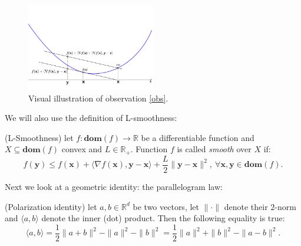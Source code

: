 \begin{figure}[h!]
    \centering
    \includegraphics[width=0.5\textwidth]{figures/observation.pdf}
    \caption{Visual illustration of observation \ref{obs}.}
\end{figure}


\noindent
We will also use the definition of L-smoothness:
\begin{property}
    (L-Smoothness) let $f:\bm{dom}(f) \rightarrow \mathbb{R}$ be a differentiable function and $X \subseteq \bm{dom}(f)$ convex and $L\in\mathbb{R}_+$. Function $f$ is called \textit{smooth} over $X$ if:
    \[  f(\bm{y}) \leq f(\bm{x}) +  \langle \nabla f(\bm{x}) , \bm{y}-\bm{x} \rangle +  \frac{L}{2} \|\bm{y}-\bm{x} \|^2 ,~  \forall \bm{x},\bm{y} \in \bm{dom}(f). \]
    \label{lsmooth}
\end{property}

\noindent
Next we look at a geometric identity: the parallelogram law:

\begin{property}
    (Polarization identity) let $a,b \in \mathbb{R}^d$ be two vectors, let $\|\cdot\|$ denote their $2$-norm and $\langle a , b \rangle$ denote the inner (dot) product. Then the following equality is true:
    \[  \langle a , b \rangle =  \frac{1}{2}\| a+b\|^2 - \|a\|^2- \|b\|^2 = \frac{1}{2}  \|a\|^2 + \|b\|^2 - \| a-b\|^2.  \]
    \label{polID}
\end{property}

